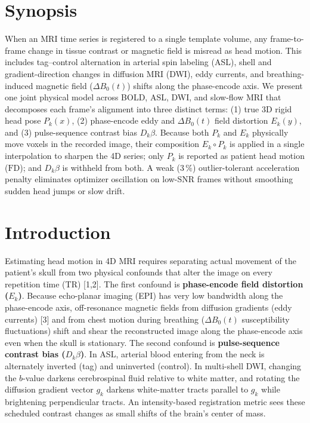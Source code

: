 \documentclass[11pt]{article}
\begin{document}
\section*{Synopsis}

When an MRI time series is registered to a single template volume, any frame-to-frame change in tissue contrast or magnetic field is misread as head motion. This includes tag--control alternation in arterial spin labeling (ASL), shell and gradient-direction changes in diffusion MRI (DWI), eddy currents, and breathing-induced magnetic field ($\Delta B_0(t)$) shifts along the phase-encode axis. We present one joint physical model across BOLD, ASL, DWI, and slow-flow MRI that decomposes each frame's alignment into three distinct terms: (1) true 3D rigid head pose $P_k(x)$, (2) phase-encode eddy and $\Delta B_0(t)$ field distortion $E_k(y)$, and (3) pulse-sequence contrast bias $D_k\beta$. Because both $P_k$ and $E_k$ physically move voxels in the recorded image, their composition $E_k \circ P_k$ is applied in a single interpolation to sharpen the 4D series; only $P_k$ is reported as patient head motion ($\text{FD}$); and $D_k\beta$ is withheld from both. A weak ($3\,\%$) outlier-tolerant acceleration penalty eliminates optimizer oscillation on low-SNR frames without smoothing sudden head jumps or slow drift.

\section*{Introduction}

Estimating head motion in 4D MRI requires separating actual movement of the patient's skull from two physical confounds that alter the image on every repetition time (TR) [1,2].
The first confound is \textbf{phase-encode field distortion ($E_k$)}. Because echo-planar imaging (EPI) has very low bandwidth along the phase-encode axis, off-resonance magnetic fields from diffusion gradients (eddy currents) [3] and from chest motion during breathing ($\Delta B_0(t)$ susceptibility fluctuations) shift and shear the reconstructed image along the phase-encode axis even when the skull is stationary.
The second confound is \textbf{pulse-sequence contrast bias ($D_k\beta$)}. In ASL, arterial blood entering from the neck is alternately inverted (tag) and uninverted (control). In multi-shell DWI, changing the $b$-value darkens cerebrospinal fluid relative to white matter, and rotating the diffusion gradient vector $g_k$ darkens white-matter tracts parallel to $g_k$ while brightening perpendicular tracts. An intensity-based registration metric sees these scheduled contrast changes as small shifts of the brain's center of mass.
\end{document}
